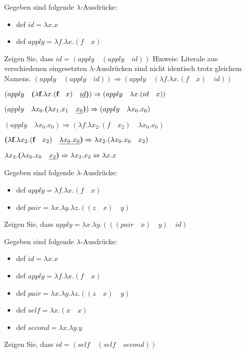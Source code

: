 \begin{card}
  Gegeben sind folgende $\lambda$-Ausdrücke:
  \begin{itemize}
  \item def $id = \lambda x.x$
  \item def $apply = \lambda f. \lambda x.(f \quad x)$
  \end{itemize}
  Zeigen Sie, dass $id = (apply \quad (apply \quad id))$
  \hr
  Hinweis: Literale aus verschiedenen eingesetzten $\lambda$-Ausdrücken sind nicht identisch trotz gleichem Namens.
  $(apply \quad (apply \quad id)) \Rightarrow (apply \quad (\lambda f. \lambda x.(f \quad x) \quad id))$

  $(apply \quad \textbf{(}\lambda \textbf{f}. \lambda x.(\textbf{f} \quad x) \quad \uline{id}\textbf{)}) \Rightarrow
  (apply \quad \lambda x.(id \quad x))$

  $(apply \quad \lambda x_{0}.\textbf{(} \lambda \textbf{$x_{1}$} . \textbf{$x_{1}$} \quad \uline{x_{0}} \textbf{)}) \Rightarrow
  (apply \quad \lambda x_{0}.x_{0})$

  $(apply \quad \lambda x_{0}.x_{0}) \Rightarrow (\lambda f. \lambda x_{2}.(f \quad x_{2}) \quad \lambda x_{0}.x_{0})$

  $\textbf{(}\lambda \textbf{f}. \lambda x_{2}.(\textbf{f} \quad x_{2}) \quad \uline{\lambda x_{0}.x_{0}} \textbf{)} \Rightarrow
  \lambda x_{2}.(\lambda x_{0}.x_{0} \quad x_{2})$

  $\lambda x_{2}.\textbf{(}\lambda \textbf{$x_{0}$}.\textbf{$x_{0}$} \quad \uline{x_{2}} \textbf{)} \Rightarrow
  \lambda x_{2}.x_{2} \Leftrightarrow \lambda x.x$
\end{card}

\begin{card}
  Gegeben sind folgende $\lambda$-Ausdrücke:
  \begin{itemize}
    \item def $apply = \lambda f. \lambda x.(f \quad x)$
    \item def $pair = \lambda x. \lambda y. \lambda z.((z \quad x ) \quad y)$
  \end{itemize}
  Zeigen Sie, dass $apply = \lambda x.\lambda y.(((pair \quad x) \quad y) \quad id)$
  \hr
\end{card}

\begin{card}
  Gegeben sind folgende $\lambda$-Ausdrücke:
  \begin{itemize}
    \item def $id = \lambda x.x$
    \item def $apply = \lambda f. \lambda x.(f \quad x)$
    \item def $pair = \lambda x. \lambda y. \lambda z.((z \quad x ) \quad y)$
    \item def $self = \lambda x.(x \quad x)$
    \item def $second = \lambda x.\lambda y. y$
  \end{itemize}
  Zeigen Sie, dass $id = (self \quad (self \quad second))$
  \hr
\end{card}

